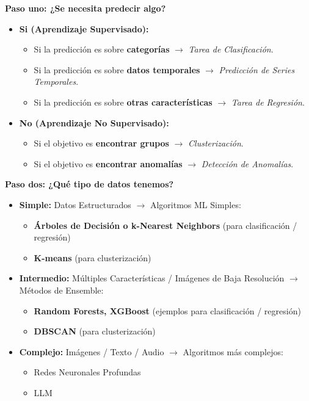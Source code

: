 \textbf{Paso uno: ¿Se necesita predecir algo?}
\begin{itemize}
	\item \textbf{Si (Aprendizaje Supervisado):}
	\begin{itemize}
		\item Si la predicción es sobre \textbf{categorías} $\rightarrow$ \textit{Tarea de Clasificación}.
		\item Si la predicción es sobre \textbf{datos temporales} $\rightarrow$ \textit{Predicción de Series Temporales}.
		\item Si la predicción es sobre \textbf{otras características} $\rightarrow$ \textit{Tarea de Regresión}.
	\end{itemize}
	\item \textbf{No (Aprendizaje No Supervisado):}
	\begin{itemize}
		\item Si el objetivo es \textbf{encontrar grupos} $\rightarrow$ \textit{Clusterización}.
		\item Si el objetivo es \textbf{encontrar anomalías} $\rightarrow$ \textit{Detección de Anomalías}.
	\end{itemize}
\end{itemize}


\textbf{Paso dos: ¿Qué tipo de datos tenemos?}
\begin{itemize}
	\item \textbf{Simple:} Datos Estructurados $\rightarrow$ Algoritmos ML Simples:
	\begin{itemize}
		\item \textbf{Árboles de Decisión o k-Nearest Neighbors} (para clasificación / regresión)
		\item \textbf{K-means} (para clusterización)
	\end{itemize}
	\item \textbf{Intermedio:} Múltiples Características / Imágenes de Baja Resolución $\rightarrow$ Métodos de Ensemble:
	\begin{itemize}
		\item \textbf{Random Forests, XGBoost }  (ejemplos para clasificación / regresión)
		\item \textbf{DBSCAN} (para clusterización)
	\end{itemize}
	\item \textbf{Complejo:} Imágenes / Texto / Audio $\rightarrow$ Algoritmos más complejos:
	\begin{itemize}
		\item Redes Neuronales Profundas
		\item LLM
	\end{itemize}
\end{itemize}

